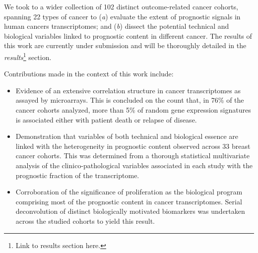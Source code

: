 We took to a wider collection of 102 distinct \mbox{outcome-related} cancer
cohorts, spanning 22 types of cancer to (\emph{a}) evaluate the extent of
prognostic signals in human cancers transcriptomes; and (\emph{b}) dissect the
potential technical and biological variables linked to prognostic content in
different cancer.  The results of this work are currently under submission and
will be thoroughly detailed in the \emph{results}\footnote{Link to results
  section here.} section.

\medskip

Contributions made in the context of this work include:
\begin{itemize}
\item Evidence of an extensive correlation structure in cancer transcriptomes as
  assayed by microarrays.  This is concluded on the count that, in 76\% of the
  cancer cohorts analyzed, more than 5\% of random gene expression signatures is
  associated either with patient death or relapse of disease.
\item Demonstration that variables of both technical and biological essence are
  linked with the heterogeneity in prognostic content observed across 33 breast
  cancer cohorts.  This was determined from a thorough statistical multivariate
  analysis of the \mbox{clinico-pathological} variables associated in each study
  with the prognostic fraction of the transcriptome.
\item Corroboration of the significance of proliferation as the biological
  program comprising most of the prognostic content in cancer transcriptomes.
  Serial deconvolution of distinct biologically motivated biomarkers was
  undertaken across the studied cohorts to yield this result.
\end{itemize}

